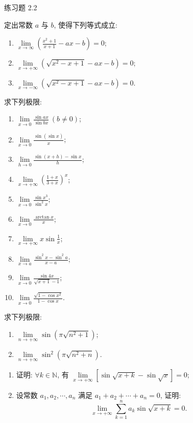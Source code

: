 \begin{exblock}{练习题 2.2}
\item 定出常数 $a$ 与 $b$, 使得下列等式成立:
  \begin{enumerate}[label=(\arabic*)]
    \item $\lim\limits_{x \to \infty} \left( \frac{x^{2} + 1}{x + 1} - ax - b \right) = 0$;
    \item $\lim\limits_{x \to +\infty} (\sqrt{x^2 - x + 1} - ax - b) = 0$;
    \item $\lim\limits_{x \to -\infty} (\sqrt{x^2 - x + 1} - ax - b) = 0$.
  \end{enumerate}

\item 求下列极限:
  \begin{enumerate}[label=(\arabic*)]
    \item $\lim\limits_{x \to 0} \frac{\sin ax}{\sin bx}\ (b \neq 0)$;
    \item $\lim\limits_{x \to 0} \frac{\sin(\sin x)}{x}$;
    \item $\lim\limits_{h\to 0}\frac{\sin(x+h)-\sin x}{h}$;
    \item $\lim\limits_{x \to +\infty} \left( \frac{1 + x}{3 + x} \right)^x$;
    \item $\lim\limits_{x \to 0} \frac{\sin x^3}{\sin^2 x}$;
    \item $\lim\limits_{x \to 0} \frac{\arctan x}{x}$;
    \item $\lim\limits_{x \to +\infty} x \sin \frac{1}{x}$;
    \item $\lim\limits_{x \to a} \frac{\sin^2 x - \sin^2 a}{x - a}$;
    \item $\lim\limits_{x \to 0} \frac{\sin 4x}{\sqrt{x+1}-1}$;
    \item $\lim\limits_{x \to 0} \frac{\sqrt{1 - \cos x^2}}{1 - \cos x}$.
  \end{enumerate}

\item 求下列极限:
  \begin{enumerate}[label=(\arabic*)]
    \item $\lim\limits_{n \to +\infty} \sin(\pi\sqrt{n^2+1})$;
    \item $\lim\limits_{n \to +\infty} \sin^2(\pi\sqrt{n^2+n})$.
  \end{enumerate}

\item 
  \begin{enumerate}[label=(\arabic*)]
    \item 证明: $\forall k \in \mathbb{N}$, 有 $\lim\limits_{x \to +\infty} \left[ \sin \sqrt{x + k} - \sin \sqrt{x} \right] = 0$;
    \item 设常数 $a_{1}, a_{2}, \cdots, a_{n}$ 满足 $a_{1} + a_{2} + \cdots + a_{n} = 0$, 证明:
    \[
    \lim_{x\to+\infty}\sum_{k=1}^{n}a_{k}\sin\sqrt{x+k}=0.
\]
  \end{enumerate}


\end{exblock}
